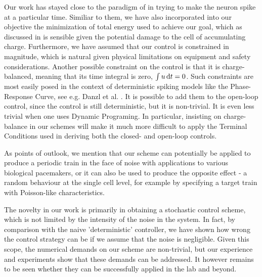 Our work has stayed close to the paradigm of \cite{Ahmadian2011} in
trying to make the neuron spike at a particular time. 
Similiar to them, we have also incorporated into our objective
the minimization of total energy used to achieve our goal, which as discussed in
\cite{Ahmadian2011} is sensible given the potential damage to the cell of
accumulating charge. Furthermore, we have assumed that our control is
constrained in magnitude, which is natural given physical limitations on
equipment and safety considerations. Another possible constraint on the control
is that it is charge-balanced, meaning that its time integral is zero, $\int u
\, \mathrm{d} t = 0$. Such constraints are most easily posed in the context of
deterministic spiking models like the Phase-Response Curve, see e.g. Danzl et
al. \cite{Danzl2010}. It is possible to add them to the open-loop control, since
the control is still deterministic, but it is non-trivial. It is even less
trivial when one uses Dynamic Programing. In
particular, insisting on charge-balance in our schemes will make it much more
difficult to apply the Terminal Conditions used in deriving both the closed- and
open-loop controls.


As points of outlook, we mention that our scheme can potentially be applied to
produce a periodic train in the face of noise with applications to various
biological pacemakers, or it can also be used to produce the opposite effect - a
random behaviour at the single cell level, for example by specifying a target
train with Poisson-like characteristics.

The novelty in our work is primarily in obtaining a stochastic control scheme,
which is not limited by the intensity of the noise in the system. In fact, by
comparison with the naive 'deterministic' controller, we have shown how wrong
the control strategy can be if we assume that the noise is negligible. Given
this scope, the numerical demands on our scheme are non-trivial, but our
experience and experiments show that these demands can be addressed.
It however remains to be seen whether they can be successfully applied in the lab
and beyond.


